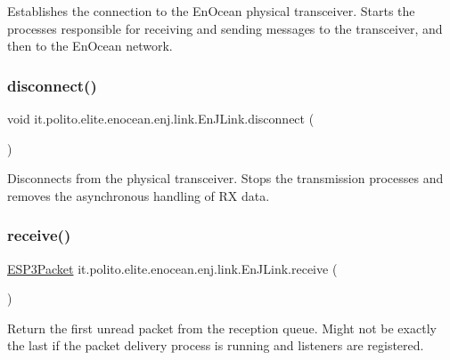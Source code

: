 Establishes the connection to the En\+Ocean physical transceiver. Starts the processes responsible for receiving and sending messages to the transceiver, and then to the En\+Ocean network. \hypertarget{classit_1_1polito_1_1elite_1_1enocean_1_1enj_1_1link_1_1_en_j_link_a1f2eb00fc4c2602f55529273ebb2e818}{}\label{classit_1_1polito_1_1elite_1_1enocean_1_1enj_1_1link_1_1_en_j_link_a1f2eb00fc4c2602f55529273ebb2e818} 
\subsubsection{\texorpdfstring{disconnect()}{disconnect()}}
{\footnotesize\ttfamily void it.\+polito.\+elite.\+enocean.\+enj.\+link.\+En\+J\+Link.\+disconnect (\begin{DoxyParamCaption}{ }\end{DoxyParamCaption})}

Disconnects from the physical transceiver. Stops the transmission processes and removes the asynchronous handling of RX data. \hypertarget{classit_1_1polito_1_1elite_1_1enocean_1_1enj_1_1link_1_1_en_j_link_a11ba9e26a4304a5b2d8b4865b2ce8b90}{}\label{classit_1_1polito_1_1elite_1_1enocean_1_1enj_1_1link_1_1_en_j_link_a11ba9e26a4304a5b2d8b4865b2ce8b90} 
\subsubsection{\texorpdfstring{receive()}{receive()}}
{\footnotesize\ttfamily \hyperlink{classit_1_1polito_1_1elite_1_1enocean_1_1protocol_1_1serial_1_1v3_1_1network_1_1packet_1_1_e_s_p3_packet}{E\+S\+P3\+Packet} it.\+polito.\+elite.\+enocean.\+enj.\+link.\+En\+J\+Link.\+receive (\begin{DoxyParamCaption}{ }\end{DoxyParamCaption})}

Return the first unread packet from the reception queue. Might not be exactly the last if the packet delivery process is running and listeners are registered.

